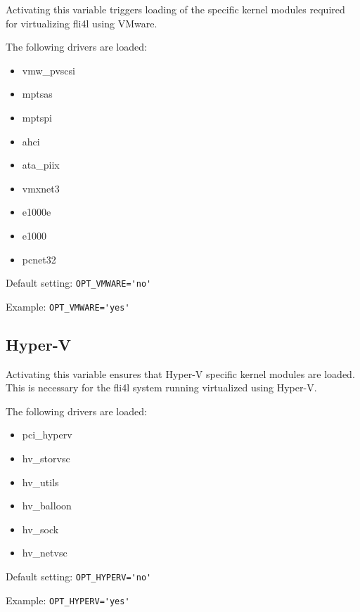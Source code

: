 \begin{description}

Activating this variable triggers loading of the specific kernel modules required 
for virtualizing fli4l using VMware. 

The following drivers are loaded:

\begin{itemize}
   \item vmw\_pvscsi
   \item mptsas
   \item mptspi
   \item ahci
   \item ata\_piix
   \item vmxnet3
   \item e1000e
   \item e1000
   \item pcnet32
\end{itemize}

Default setting: \verb+OPT_VMWARE='no'+

Example: \verb+OPT_VMWARE='yes'+

\end{description}

\subsection {Hyper-V}

\begin{description}

Activating this variable ensures that Hyper-V specific kernel modules 
are loaded. This is necessary for the fli4l system running virtualized 
using Hyper-V.

The following drivers are loaded: 

\begin{itemize}
    \item pci\_hyperv
    \item hv\_storvsc
    \item hv\_utils
    \item hv\_balloon
    \item hv\_sock
    \item hv\_netvsc
\end{itemize}

Default setting: \verb+OPT_HYPERV='no'+

Example: \verb+OPT_HYPERV='yes'+

\end{description}
